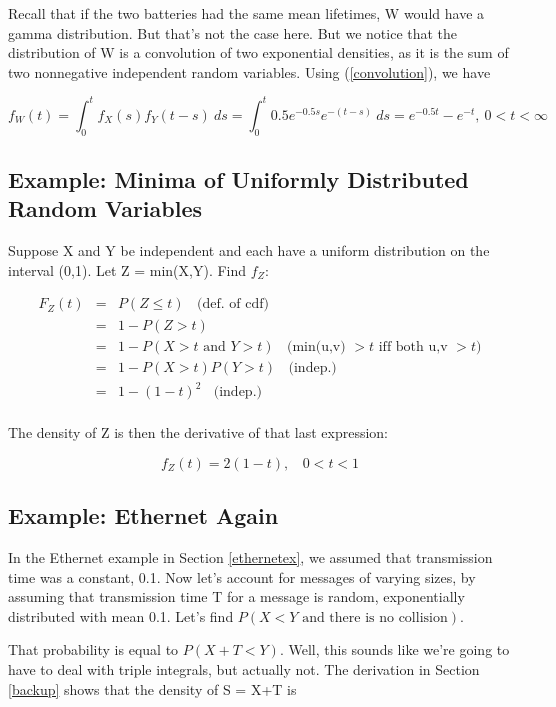 Recall that if the two batteries had the same mean lifetimes, W would
have a gamma distribution.  But that's not the case here.  But we notice
that the distribution of W is a convolution of two exponential
densities, as it is the sum of two nonnegative independent random
variables.  Using (\ref{convolution}), we have

\begin{equation}
f_W(t) = \int_{0}^t f_X(s) f_Y(t-s) ~ ds
= \int_{0}^t 0.5e^{-0.5s} e^{-(t-s)}~ ds
= e^{-0.5t} - e^{-t}, ~ 0 < t < \infty
\end{equation}

\subsection{Example:  Minima of Uniformly Distributed Random Variables}
\label{minunif}

Suppose X and Y be independent and each have a uniform distribution on
the interval (0,1).  Let Z = min(X,Y).  Find $f_Z$:

\begin{eqnarray}
F_{Z}(t) &=& P(Z \leq t) ~~~~ \textrm{(def. of cdf) }\\
&=& 1-P(Z>t) \\
&=& 1-P(X > t \textrm{ and } Y > t)  ~~~~
\textrm{(min(u,v) $> t$ iff both u,v $> t$)} \\
&=& 1 - P(X > t) P(Y > t) ~~~~ \textrm{(indep.) }\\
&=& 1 - (1-t)^2 ~~~~ \textrm{(indep.) }\\
\end{eqnarray}

The density of Z is then the derivative of that last expression:

\begin{equation}
f_Z(t) = 2(1-t), ~~~~ 0 < t < 1 
\end{equation}

\subsection{Example:  Ethernet Again}

In the Ethernet example in Section \ref{ethernetex}, we assumed that
transmission time was a constant, 0.1.  Now let's account for messages
of varying sizes, by assuming that transmission time T for a message is
random, exponentially distributed with mean 0.1.  Let's find $P(X < Y
\textrm{ and there is no collision})$.

That probability is equal to $P(X+T < Y)$.   Well, this sounds like
we're going to have to deal with triple integrals, but actually not.
The derivation in Section \ref{backup} shows that the density of S = X+T 
is

